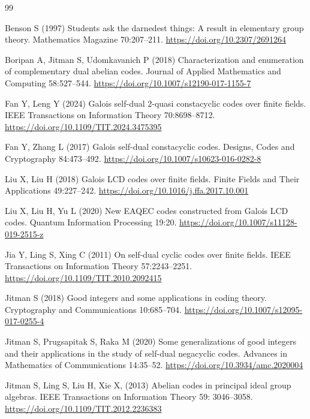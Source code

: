 \documentclass[pdflatex,sn-mathphys-num]{sn-jnl}%
\theoremstyle{thmstyleone}%
\theoremstyle{thmstyletwo}%
\theoremstyle{thmstylethree}%
\begin{document}
  

\begin{thebibliography}{99}

 Benson S (1997) Students ask the darnedest things: A result in elementary group theory. 
Mathematics Magazine 70:207--211. \url{https://doi.org/10.2307/2691264}

 Boripan A, Jitman S,   Udomkavanich P (2018) Characterization and enumeration of complementary dual abelian codes.  Journal of Applied Mathematics and Computing  58:527–544. \url{https://doi.org/10.1007/s12190-017-1155-7}

 Fan Y,  Leng Y (2024) Galois self-dual $2$-quasi constacyclic codes over finite fields. IEEE Transactions on Information Theory 70:8698--8712. \url{https://doi.org/10.1109/TIT.2024.3475395}
 

Fan Y,  Zhang L (2017)
Galois self-dual constacyclic codes. Designs, Codes and Cryptography 84:473--492. \url{https://doi.org/10.1007/s10623-016-0282-8}



Liu X,  Liu H (2018)
Galois LCD codes over finite fields.
Finite Fields and Their Applications 49:227--242.
\url{https://doi.org/10.1016/j.ffa.2017.10.001}

Liu  X, Liu H,  Yu L (2020) New EAQEC codes constructed from Galois LCD codes. Quantum Information Processing 19:20. \url{https://doi.org/10.1007/s11128-019-2515-z}

Jia Y,  Ling S,  Xing C (2011)
On self-dual cyclic codes over finite fields. IEEE Transactions on Information Theory 57:2243--2251. \url{https://doi.org/10.1109/TIT.2010.2092415}

 Jitman S  (2018)
Good integers and some applications in coding theory. Cryptography and Communications 10:685--704. \url{ https://doi.org/10.1007/s12095-017-0255-4}

Jitman S,  Prugsapitak S, Raka M (2020)
Some generalizations of good integers and their applications in the study of self-dual negacyclic codes.
Advances in Mathematics of Communications  14:35--52. \url{https://doi.org/10.3934/amc.2020004}

Jitman S, Ling S, Liu H,  Xie X, (2013)
Abelian codes in principal ideal group algebras. IEEE Transactions on Information Theory 59: 3046--3058. \url{https://doi.org/10.1109/TIT.2012.2236383}


\end{thebibliography}
\end{document}
